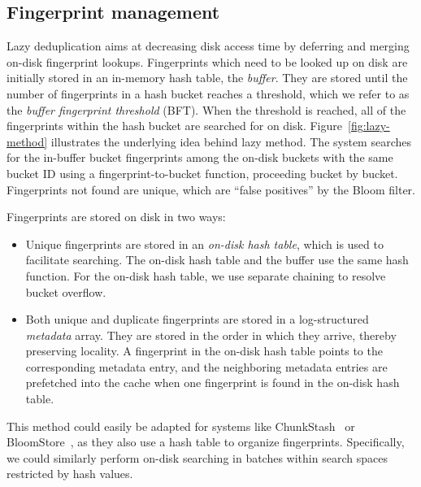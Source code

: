 \documentclass[prodmode,acmtecs]{acmsmall}
\begin{document}
\subsection{Fingerprint management}

Lazy deduplication aims at decreasing disk access time by deferring and merging on-disk fingerprint lookups.  Fingerprints which need to be looked up on disk are initially stored in an in-memory hash table, the \emph{buffer}.  They are stored until the number of fingerprints in a hash bucket reaches a threshold, which we refer to as the \emph{buffer fingerprint threshold} (BFT).  When the threshold is reached, all of the fingerprints within the hash bucket are searched for on disk.  Figure~\ref{fig:lazy-method} illustrates the underlying idea behind lazy method.  The system searches for the in-buffer bucket fingerprints among the on-disk buckets with the same bucket ID using a fingerprint-to-bucket function, proceeding bucket by bucket.  Fingerprints not found are unique, which are ``false positives'' by the Bloom filter.


Fingerprints are stored on disk in two ways:
\begin{itemize}
 \item Unique fingerprints are stored in an \emph{on-disk hash table}, which is used to facilitate searching.  The on-disk hash table and the buffer use the same hash function.  For the on-disk hash table, we use separate chaining to resolve bucket overflow.
 \item Both unique and duplicate fingerprints are stored in a log-structured \emph{metadata} array.  They are stored in the order in which they arrive, thereby preserving locality. A fingerprint in the on-disk hash table points to the corresponding metadata entry, and the neighboring metadata entries are prefetched into the cache when one fingerprint is found in the on-disk hash table.
\end{itemize}

This method could easily be adapted for systems like ChunkStash~\cite{debnath2010chunkstash} or BloomStore~\cite{lu2012bloomstore}, as they also use a hash table to organize fingerprints. Specifically, we could similarly perform on-disk searching in batches within search spaces restricted by hash values.
\end{document}
